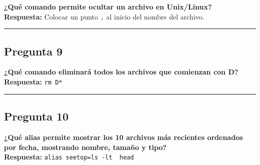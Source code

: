 \documentclass[
]{article}
\begin{document}
\textbf{¿Qué comando permite ocultar un archivo en Unix/Linux?}\\
\textbf{Respuesta:} Colocar un punto \texttt{.} al inicio del nombre del
archivo.

\begin{center}\rule{0.5\linewidth}{0.5pt}\end{center}

\subsection{Pregunta 9}\label{pregunta-9}

\textbf{¿Qué comando eliminará todos los archivos que comienzan con
D?}\\
\textbf{Respuesta:} \texttt{rm\ D*}

\begin{center}\rule{0.5\linewidth}{0.5pt}\end{center}

\subsection{Pregunta 10}\label{pregunta-10}

\textbf{¿Qué alias permite mostrar los 10 archivos más recientes
ordenados por fecha, mostrando nombre, tamaño y tipo?}\\
\textbf{Respuesta:}
\texttt{alias\ seetop=\textquotesingle{}ls\ -lt\ \textbar{}\ head\textquotesingle{}}
\end{document}
